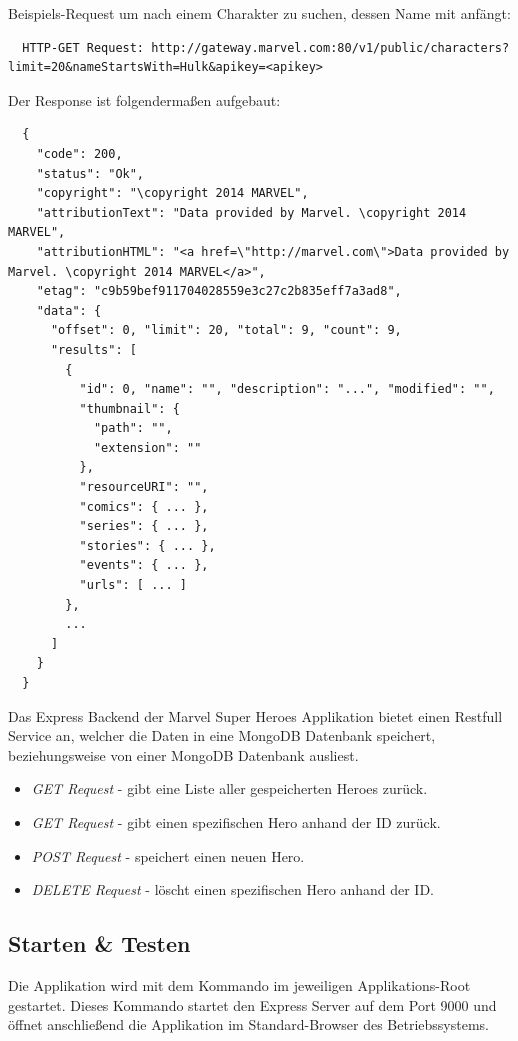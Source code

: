 Beispiels-Request um nach einem Charakter zu suchen, dessen Name mit  anfängt:
\begin{lstlisting}
  HTTP-GET Request: http://gateway.marvel.com:80/v1/public/characters?limit=20&nameStartsWith=Hulk&apikey=<apikey>
\end{lstlisting}

Der Response ist folgendermaßen aufgebaut:
\begin{lstlisting}
  {
    "code": 200,
    "status": "Ok",
    "copyright": "\copyright 2014 MARVEL",
    "attributionText": "Data provided by Marvel. \copyright 2014 MARVEL",
    "attributionHTML": "<a href=\"http://marvel.com\">Data provided by Marvel. \copyright 2014 MARVEL</a>",
    "etag": "c9b59bef911704028559e3c27c2b835eff7a3ad8",
    "data": {
      "offset": 0, "limit": 20, "total": 9, "count": 9,
      "results": [
        {
          "id": 0, "name": "", "description": "...", "modified": "",
          "thumbnail": {
            "path": "",
            "extension": ""
          },
          "resourceURI": "",
          "comics": { ... },
          "series": { ... },
          "stories": { ... },
          "events": { ... },
          "urls": [ ... ]
        },
        ...
      ]
    }
  }
\end{lstlisting}

Das Express Backend der Marvel Super Heroes Applikation bietet einen Restfull  Service an, welcher die Daten in eine MongoDB Datenbank speichert, beziehungsweise von einer MongoDB Datenbank ausliest.
\begin{itemize}
  \item \textit{GET Request } - gibt eine Liste aller gespeicherten Heroes zurück.
  \item \textit{GET Request } - gibt einen spezifischen Hero anhand der ID zurück.
  \item \textit{POST Request } - speichert einen neuen Hero.
  \item \textit{DELETE Request } - löscht einen spezifischen Hero anhand der ID.
\end{itemize}

\subsection{Starten \& Testen}
Die Applikation wird mit dem Kommando  im jeweiligen Applikations-Root gestartet. Dieses Kommando startet den Express Server auf dem Port 9000 und öffnet anschließend die Applikation im Standard-Browser des Betriebssystems.

